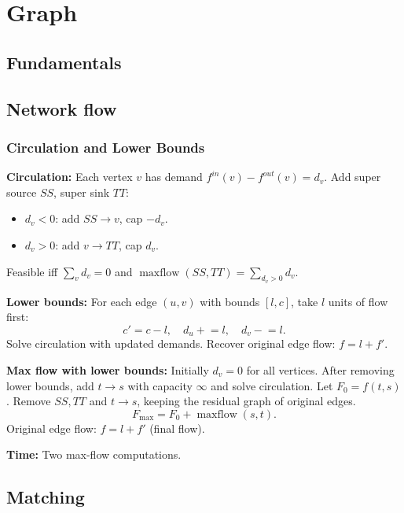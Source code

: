 \chapter{Graph}

\section{Fundamentals}

\section{Network flow}
		
	\subsection*{Circulation and Lower Bounds}
		\textbf{Circulation:}
		Each vertex $v$ has demand
		$f^{in}(v)-f^{out}(v)=d_v$.
		Add super source $SS$, super sink $TT$:
		\begin{itemize}
		\setlength{\itemsep}{0pt}
		\item $d_v<0$: add $SS\to v$, cap $-d_v$.
		\item $d_v>0$: add $v\to TT$, cap $d_v$.
		\end{itemize}
		Feasible iff $\sum_v d_v=0$ and
		$\operatorname{maxflow}(SS,TT)=\sum_{d_v>0}d_v$.

		\textbf{Lower bounds:}
		For each edge $(u,v)$ with bounds $[l,c]$,
		take $l$ units of flow first:
		\[
		c'=c-l,\quad d_u\mathrel{+}=l,\quad d_v\mathrel{-}=l.
		\]
		Solve circulation with updated demands.
		Recover original edge flow: $f=l+f'$.

		\textbf{Max flow with lower bounds:}
		Initially $d_v=0$ for all vertices.
		After removing lower bounds, add $t\to s$
		with capacity $\infty$ and solve circulation.
		Let $F_0=f(t,s)$.
		Remove $SS,TT$ and $t\to s$, keeping
		the residual graph of original edges.
		\[
		F_{\max}=F_0+\operatorname{maxflow}(s,t).
		\]
		Original edge flow: $f=l+f'$ (final flow).
		
		\textbf{Time:} Two max-flow computations.
	

\section{Matching}

